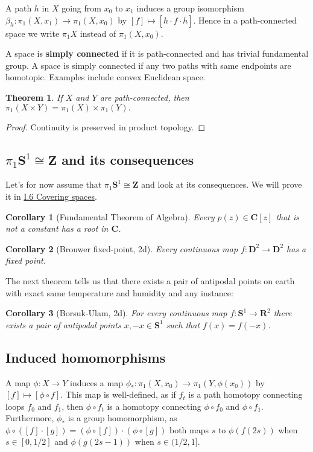 \documentclass[11pt]{article}
\theoremstyle{definition}
\theoremstyle{plain}
\newtheorem*{corollary}{Corollary}
\newtheorem{theorem}{Theorem}
\theoremstyle{remark}
\newcommand{\R}{\mathbf{R}}
\newcommand{\Z}{\mathbf{Z}}
\newcommand{\C}{\mathbf{C}}
\newcommand{\D}{\mathbf{D}}
\begin{document}
A path $h$ in $X$ going from $x_0$ to $x_1$ induces a group isomorphism $\beta_h:\pi_1(X,x_1)\to\pi_1(X,x_0)$ by $[f]\mapsto[h\cdot f\cdot\overline{h}]$. Hence in a path-connected space we write $\pi_1X$ instead of $\pi_1(X,x_0)$.
\medbreak

A space is \textbf{simply connected} if it is path-connected and has trivial fundamental group. A space is simply connected if any two paths with same endpoints are homotopic. Examples include convex Euclidean space.

\begin{theorem}
If $X$ and $Y$ are path-connected, then $\pi_1(X\times Y)=\pi_1(X)\times \pi_1(Y).$
\end{theorem}
\begin{proof}
Continuity is preserved in product topology.
\end{proof}

\subsection{$\pi_1\mathbf{S}^1\cong\Z$ and its consequences}\label{4}

Let's for now assume that $\pi_1\mathbf{S}^1\cong\Z$ and look at its consequences. We will prove it in \hyperref[8]{I.6 Covering spaces}.

\begin{corollary}[Fundamental Theorem of Algebra]
Every $p(z)\in\C[z]$ that is not a constant has a root in $\C$.
\end{corollary}

\begin{corollary}[Brouwer fixed-point, 2d]
Every continuous map $f:\D^2\to\D^2$ has a fixed point.
\end{corollary}

The next theorem tells us that there exists a pair of antipodal points on earth with exact same temperature and humidity and any instance:

\begin{corollary}[Borsuk-Ulam, 2d]
For every continuous map $f:\mathbf{S}^1\to\R^2$ there exists a pair of antipodal points $x,-x\in\mathbf{S}^1$ such that $f(x)=f(-x)$.
\end{corollary}

\subsection{Induced homomorphisms}\label{6}

A map $\phi:X\to Y$ induces a map $\phi_\ast:\pi_1(X,x_0)\to\pi_1(Y,\phi(x_0))$ by $[f]\mapsto[\phi\circ f]$. This map is well-defined, as if $f_t$ is a path homotopy connecting loops $f_0$ and $f_1$, then $\phi\circ f_t$ is a homotopy connecting $\phi\circ f_0$ and $\phi\circ f_1$. Furthermore, $\phi_\ast$ is a group homomorphism, as $\phi\circ([f]\cdot[g])=(\phi\circ[f])\cdot(\phi\circ[g])$ both maps $s$ to $\phi(f(2s))$ when $s\in[0,1/2]$ and $\phi(g(2s-1))$ when $s\in(1/2,1]$.\medbreak
\end{document}
